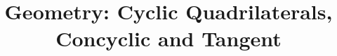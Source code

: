 \documentclass[a4paper,12pt]{article}
\begin{document}
\title{Geometry: Cyclic Quadrilaterals, Concyclic and Tangent}
\newcommand\event{S.3,4 Elite Mathematics Training}
\newcommand\learningobjective{
\item Learn properties of cyclic quadrilaterals
\item Learn tangent of circle
}

\myfrontpage


\mynewpage


\newpage


\newpage

\begin{question}[]{}
    
    
    
    
\end{question}
\end{document}
